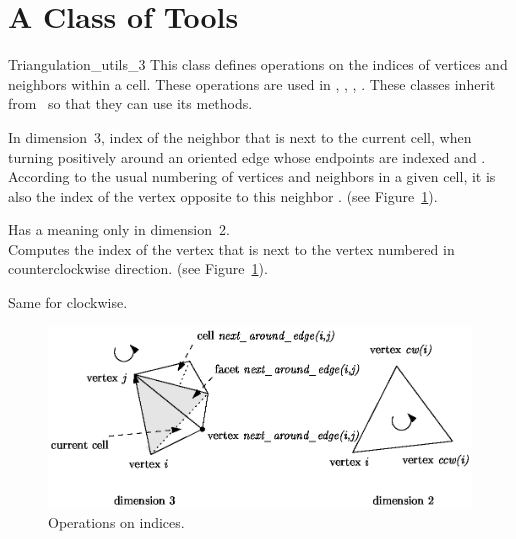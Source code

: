 \clearpage


\section{A Class of Tools}
\label{Triangulation3-sec-class-Utils}

\begin{ccClass}{Triangulation_utils_3}
This class defines operations on the indices of vertices and neighbors 
within a cell. These operations are used in ,
,
,
. These classes inherit from
\ccClassName\ so that they can use its methods.


{In dimension~3, index of the neighbor  that is next to the current cell,
when turning positively around an oriented edge whose endpoints are
indexed  and . According to the usual numbering of
vertices and neighbors in a given cell, it is also the index of the vertex 
opposite to this neighbor . (see Figure~\ref{Triangulation3-fig-utils}).
}

{Has a meaning only in dimension~2.\\
 Computes the index of the vertex that is next to the vertex numbered
 in counterclockwise direction. (see
Figure~\ref{Triangulation3-fig-utils}).  
}

{Same for clockwise.}

\begin{ccTexOnly}
\begin{figure}[htbp]
\begin{center} 
\includegraphics{utils.eps} 
\end{center}
\caption{Operations on indices.\label{Triangulation3-fig-utils}}
\end{figure} 
\end{ccTexOnly}


\end{ccClass}
